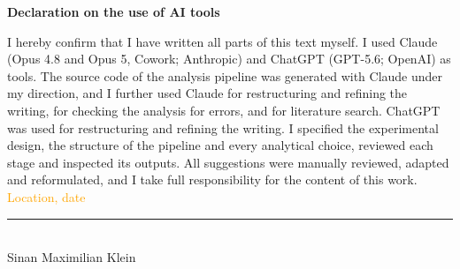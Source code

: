 \documentclass[12pt]{article}
\newcommand{\myname}{Sinan Maximilian Klein}
\begin{document}
\Large
\noindent
\textbf{Declaration on the use of AI tools}
\vspace{0.5cm}
\noindent
\normalsize

I hereby confirm that I have written all parts of this text myself. I used Claude
(Opus 4.8 and Opus 5, Cowork; Anthropic) and ChatGPT (GPT-5.6; OpenAI) as tools. The source code of
the analysis pipeline was generated with Claude under my direction, and I further used Claude for
restructuring and refining the writing, for checking the analysis for errors, and for literature
search. ChatGPT was used for restructuring and refining the writing. I specified the
experimental design, the structure of the pipeline and every analytical choice, reviewed each
stage and inspected its outputs. All suggestions were manually reviewed, adapted and reformulated,
and I take full responsibility for the content of this work.
\\

\vspace{1cm}
\textcolor{orange}{Location, date} \\

\vspace{3cm}

\noindent\rule{0.5\textwidth}{0.4pt} \\

\myname

\end{document}

